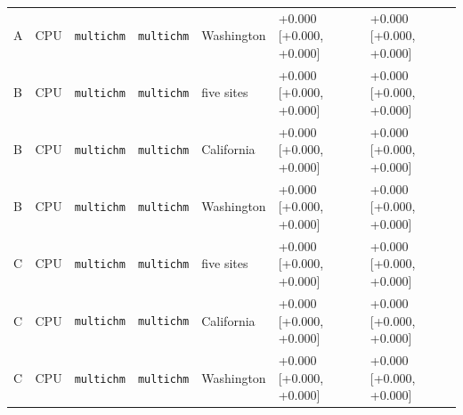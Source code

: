 \documentclass[10pt]{article}
\begin{document}
{\begin{xltabular}{\textwidth}{llLllLL}
A & CPU & \texttt{multichm} & \texttt{multichm} & Washington & +0.000 [+0.000, +0.000] & +0.000 [+0.000, +0.000] \\
B & CPU & \texttt{multichm} & \texttt{multichm} & five sites & +0.000 [+0.000, +0.000] & +0.000 [+0.000, +0.000] \\
B & CPU & \texttt{multichm} & \texttt{multichm} & California & +0.000 [+0.000, +0.000] & +0.000 [+0.000, +0.000] \\
B & CPU & \texttt{multichm} & \texttt{multichm} & Washington & +0.000 [+0.000, +0.000] & +0.000 [+0.000, +0.000] \\
C & CPU & \texttt{multichm} & \texttt{multichm} & five sites & +0.000 [+0.000, +0.000] & +0.000 [+0.000, +0.000] \\
C & CPU & \texttt{multichm} & \texttt{multichm} & California & +0.000 [+0.000, +0.000] & +0.000 [+0.000, +0.000] \\
C & CPU & \texttt{multichm} & \texttt{multichm} & Washington & +0.000 [+0.000, +0.000] & +0.000 [+0.000, +0.000] \\
\end{xltabular}
}
\end{document}
